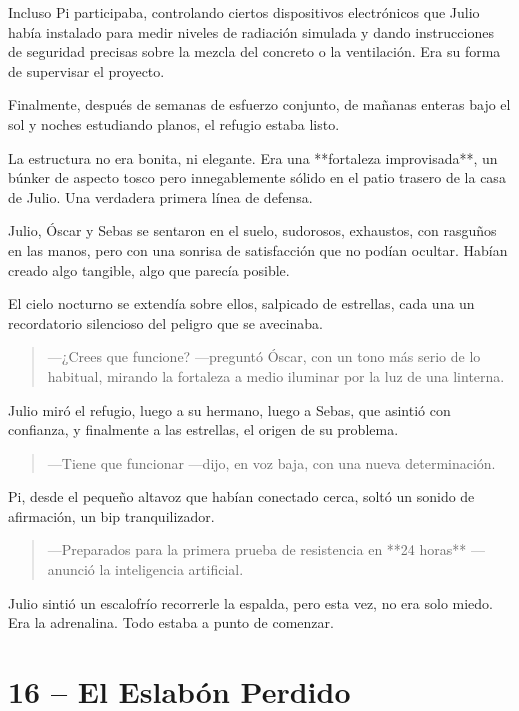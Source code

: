 \documentclass[a4paper,12pt]{book}
\begin{document}
Incluso Pi participaba, controlando ciertos dispositivos electrónicos que Julio había instalado para medir niveles de radiación simulada y dando instrucciones de seguridad precisas sobre la mezcla del concreto o la ventilación. Era su forma de supervisar el proyecto.

Finalmente, después de semanas de esfuerzo conjunto, de mañanas enteras bajo el sol y noches estudiando planos, el refugio estaba listo.

La estructura no era bonita, ni elegante. Era una **fortaleza improvisada**, un búnker de aspecto tosco pero innegablemente sólido en el patio trasero de la casa de Julio. Una verdadera primera línea de defensa.

Julio, Óscar y Sebas se sentaron en el suelo, sudorosos, exhaustos, con rasguños en las manos, pero con una sonrisa de satisfacción que no podían ocultar. Habían creado algo tangible, algo que parecía posible.

El cielo nocturno se extendía sobre ellos, salpicado de estrellas, cada una un recordatorio silencioso del peligro que se avecinaba.

\begin{quote}
    —¿Crees que funcione? —preguntó Óscar, con un tono más serio de lo habitual, mirando la fortaleza a medio iluminar por la luz de una linterna.
\end{quote}

Julio miró el refugio, luego a su hermano, luego a Sebas, que asintió con confianza, y finalmente a las estrellas, el origen de su problema.

\begin{quote}
    —Tiene que funcionar —dijo, en voz baja, con una nueva determinación.
\end{quote}

Pi, desde el pequeño altavoz que habían conectado cerca, soltó un sonido de afirmación, un bip tranquilizador.

\begin{quote}
    —Preparados para la primera prueba de resistencia en **24 horas** —anunció la inteligencia artificial.
\end{quote}

Julio sintió un escalofrío recorrerle la espalda, pero esta vez, no era solo miedo. Era la adrenalina. Todo estaba a punto de comenzar.

\cleardoublepage %

\chapter*{16 – El Eslabón Perdido}
\end{document}
